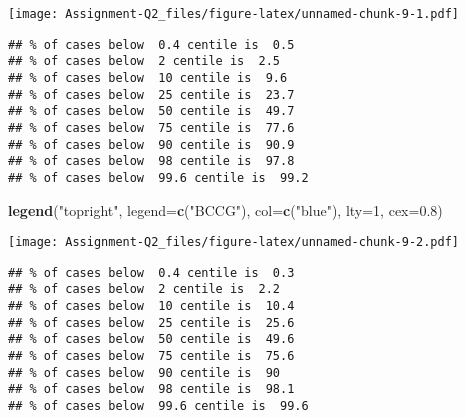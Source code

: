 \documentclass[
]{article}
\newenvironment{Shaded}{\begin{snugshade}}{\end{snugshade}}
\newcommand{\AttributeTok}[1]{\textcolor[rgb]{0.13,0.29,0.53}{#1}}
\newcommand{\CommentTok}[1]{\textcolor[rgb]{0.56,0.35,0.01}{\textit{#1}}}
\newcommand{\DecValTok}[1]{\textcolor[rgb]{0.00,0.00,0.81}{#1}}
\newcommand{\FloatTok}[1]{\textcolor[rgb]{0.00,0.00,0.81}{#1}}
\newcommand{\FunctionTok}[1]{\textcolor[rgb]{0.13,0.29,0.53}{\textbf{#1}}}
\newcommand{\NormalTok}[1]{#1}
\newcommand{\SpecialCharTok}[1]{\textcolor[rgb]{0.81,0.36,0.00}{\textbf{#1}}}
\newcommand{\StringTok}[1]{\textcolor[rgb]{0.31,0.60,0.02}{#1}}
\begin{document}
\texttt{[image: Assignment-Q2\_files/figure-latex/unnamed-chunk-9-1.pdf]}

\begin{Shaded}
\end{Shaded}

\begin{verbatim}
## % of cases below  0.4 centile is  0.5 
## % of cases below  2 centile is  2.5 
## % of cases below  10 centile is  9.6 
## % of cases below  25 centile is  23.7 
## % of cases below  50 centile is  49.7 
## % of cases below  75 centile is  77.6 
## % of cases below  90 centile is  90.9 
## % of cases below  98 centile is  97.8 
## % of cases below  99.6 centile is  99.2
\end{verbatim}

\begin{Shaded}
\begin{Highlighting}[]
\FunctionTok{legend}\NormalTok{(}\StringTok{"topright"}\NormalTok{, }\AttributeTok{legend=}\FunctionTok{c}\NormalTok{(}\StringTok{"BCCG"}\NormalTok{), }\AttributeTok{col=}\FunctionTok{c}\NormalTok{(}\StringTok{"blue"}\NormalTok{), }\AttributeTok{lty=}\DecValTok{1}\NormalTok{, }\AttributeTok{cex=}\FloatTok{0.8}\NormalTok{)}
\end{Highlighting}
\end{Shaded}

\texttt{[image: Assignment-Q2\_files/figure-latex/unnamed-chunk-9-2.pdf]}

\begin{Shaded}
\end{Shaded}

\begin{verbatim}
## % of cases below  0.4 centile is  0.3 
## % of cases below  2 centile is  2.2 
## % of cases below  10 centile is  10.4 
## % of cases below  25 centile is  25.6 
## % of cases below  50 centile is  49.6 
## % of cases below  75 centile is  75.6 
## % of cases below  90 centile is  90 
## % of cases below  98 centile is  98.1 
## % of cases below  99.6 centile is  99.6
\end{verbatim}
\end{document}

